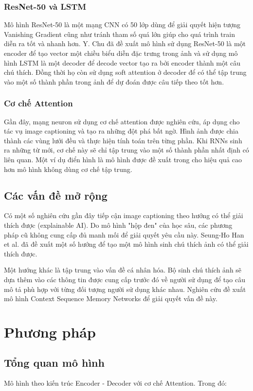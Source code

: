 \documentclass[conference]{IEEEtran}
\begin{document}
\subsubsection{ResNet-50 và LSTM}
Mô hình ResNet-50 là một mạng CNN có 50 lớp dùng để giải quyết hiện tượng Vanishing Gradient cũng như tránh tham số quá lớn giúp cho quá trình train diễn ra tốt và nhanh hơn.  Y. Chu \cite{chu2020automatic} đã đề xuất mô hình sử dụng ResNet-50 là một encoder để tạo vector một chiều biểu diễn đặc trưng trong ảnh và sử dụng mô hình LSTM là một decoder để decode vector tạo ra bởi encoder thành một câu chú thích. Đồng thời họ còn sử dụng soft attention ở decoder để có thể tập trung vào một số thành phần trong ảnh để dự đoán được câu tiếp theo tốt hơn. 
\subsubsection{Cơ chế Attention} 
Gần đây, mạng neuron sử dụng cơ chế attention được nghiên cứu, áp dụng cho tác vụ image captioning và tạo ra những đột phá bất ngờ.
Hình ảnh được chia thành các vùng lưới đều và thực hiện tính toán trên từng phần.
Khi RNNs sinh ra những từ mới, cơ chế này sẽ chỉ tập trung vào một số thành phần nhất định có liên quan.
Một ví dụ điển hình là mô hình được đề xuất trong \cite{yan2020image} cho hiệu quả cao hơn mô hình không dùng cơ chế tập trung.


\subsection{Các vấn đề mở rộng}
Có một số nghiên cứu gần đây tiếp cận image captioning theo hướng có thể giải thích được (explainable AI). Do mô hình "hộp đen" của học sâu, các phương pháp cũ không cung cấp đủ manh mối để giải quyết yêu cầu này. Seung-Ho Han et al. \cite{han2020explainable} đã đề xuất một số hướng để tạo một mô hình sinh chú thích ảnh có thể giải thích được.

Một hướng khác là tập trung vào vấn đề cá nhân hóa. Bộ sinh chú thích ảnh sẽ dựa thêm vào các thông tin được cung cấp trước đó về người sử dụng để tạo câu mô tả phù hợp với từng đối tượng người sử dụng khác nhau. Nghiên cứu \cite{chunseong2017attend} đề xuất mô hình Context Sequence Memory Networks để giải quyết vấn đề này.

\section{Phương pháp\label{method}}
\subsection{Tổng quan mô hình}
Mô hình theo kiến trúc Encoder - Decoder với cơ chế Attention. Trong đó:
\end{document}
